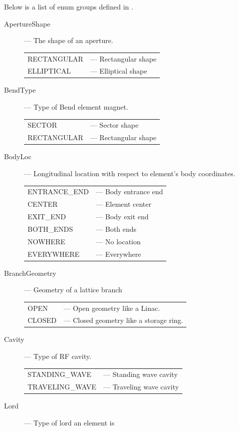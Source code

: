 Below is a list of enum groups defined in \accellat. 
\begin{description}
%
\item[ApertureShape] --- The shape of an aperture.\Newline 
\hspace*{-20pt}
\begin{tabular}{ll}
  RECTANGULAR & --- Rectangular shape \\
  ELLIPTICAL  & --- Elliptical shape \\
\end{tabular}
%
\item[BendType] --- Type of Bend element magnet.\Newline
\hspace*{-20pt}
\begin{tabular}{ll}
  SECTOR      & --- Sector shape\\
  RECTANGULAR & --- Rectangular shape \\
\end{tabular}
%
\item[BodyLoc] --- Longitudinal location with respect to element's body coordinates.\Newline
\hspace*{-20pt}
\begin{tabular}{ll}
  ENTRANCE_END & --- Body entrance end \\
  CENTER       & --- Element center \\
  EXIT_END     & --- Body exit end \\
  BOTH_ENDS    & --- Both ends \\
  NOWHERE      & --- No location \\
  EVERYWHERE   & --- Everywhere \\
\end{tabular}
%
\item[BranchGeometry] --- Geometry of a lattice branch\Newline
\hspace*{-20pt}
\begin{tabular}{ll}
  OPEN    & --- Open geometry like a Linac. \\
  CLOSED  & --- Closed geometry like a storage ring.
\end{tabular}
%
\item[Cavity] --- Type of RF cavity. \Newline
\hspace*{-20pt}
\begin{tabular}{ll}
  STANDING_WAVE   & --- Standing wave cavity \\
  TRAVELING_WAVE  & --- Traveling wave cavity \\
\end{tabular}
%
\item[Lord] --- Type of lord an element is \Newline

\end{description}

